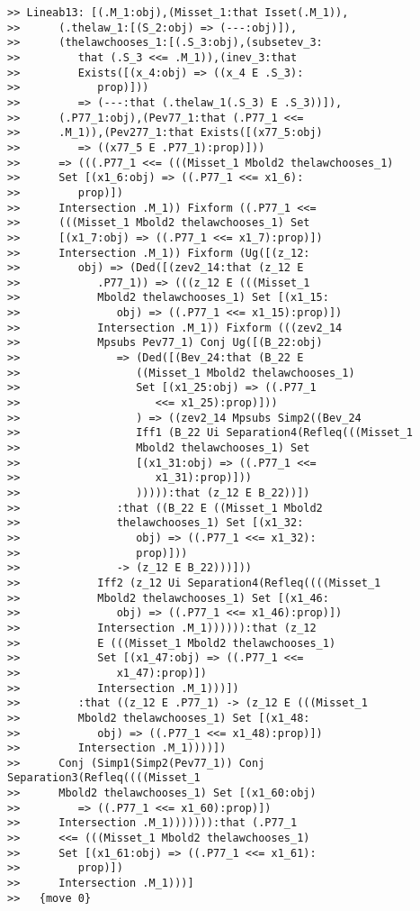\documentclass[12pt]{article}
\begin{document}
\begin{verbatim}
>> Lineab13: [(.M_1:obj),(Misset_1:that Isset(.M_1)),
>>      (.thelaw_1:[(S_2:obj) => (---:obj)]),
>>      (thelawchooses_1:[(.S_3:obj),(subsetev_3:
>>         that (.S_3 <<= .M_1)),(inev_3:that
>>         Exists([(x_4:obj) => ((x_4 E .S_3):
>>            prop)]))
>>         => (---:that (.thelaw_1(.S_3) E .S_3))]),
>>      (.P77_1:obj),(Pev77_1:that (.P77_1 <<=
>>      .M_1)),(Pev277_1:that Exists([(x77_5:obj)
>>         => ((x77_5 E .P77_1):prop)]))
>>      => (((.P77_1 <<= (((Misset_1 Mbold2 thelawchooses_1)
>>      Set [(x1_6:obj) => ((.P77_1 <<= x1_6):
>>         prop)])
>>      Intersection .M_1)) Fixform ((.P77_1 <<=
>>      (((Misset_1 Mbold2 thelawchooses_1) Set
>>      [(x1_7:obj) => ((.P77_1 <<= x1_7):prop)])
>>      Intersection .M_1)) Fixform (Ug([(z_12:
>>         obj) => (Ded([(zev2_14:that (z_12 E
>>            .P77_1)) => (((z_12 E (((Misset_1
>>            Mbold2 thelawchooses_1) Set [(x1_15:
>>               obj) => ((.P77_1 <<= x1_15):prop)])
>>            Intersection .M_1)) Fixform (((zev2_14
>>            Mpsubs Pev77_1) Conj Ug([(B_22:obj)
>>               => (Ded([(Bev_24:that (B_22 E
>>                  ((Misset_1 Mbold2 thelawchooses_1)
>>                  Set [(x1_25:obj) => ((.P77_1
>>                     <<= x1_25):prop)]))
>>                  ) => ((zev2_14 Mpsubs Simp2((Bev_24
>>                  Iff1 (B_22 Ui Separation4(Refleq(((Misset_1
>>                  Mbold2 thelawchooses_1) Set
>>                  [(x1_31:obj) => ((.P77_1 <<=
>>                     x1_31):prop)]))
>>                  ))))):that (z_12 E B_22))])
>>               :that ((B_22 E ((Misset_1 Mbold2
>>               thelawchooses_1) Set [(x1_32:
>>                  obj) => ((.P77_1 <<= x1_32):
>>                  prop)]))
>>               -> (z_12 E B_22)))]))
>>            Iff2 (z_12 Ui Separation4(Refleq((((Misset_1
>>            Mbold2 thelawchooses_1) Set [(x1_46:
>>               obj) => ((.P77_1 <<= x1_46):prop)])
>>            Intersection .M_1)))))):that (z_12
>>            E (((Misset_1 Mbold2 thelawchooses_1)
>>            Set [(x1_47:obj) => ((.P77_1 <<=
>>               x1_47):prop)])
>>            Intersection .M_1)))])
>>         :that ((z_12 E .P77_1) -> (z_12 E (((Misset_1
>>         Mbold2 thelawchooses_1) Set [(x1_48:
>>            obj) => ((.P77_1 <<= x1_48):prop)])
>>         Intersection .M_1))))])
>>      Conj (Simp1(Simp2(Pev77_1)) Conj Separation3(Refleq((((Misset_1
>>      Mbold2 thelawchooses_1) Set [(x1_60:obj)
>>         => ((.P77_1 <<= x1_60):prop)])
>>      Intersection .M_1))))))):that (.P77_1
>>      <<= (((Misset_1 Mbold2 thelawchooses_1)
>>      Set [(x1_61:obj) => ((.P77_1 <<= x1_61):
>>         prop)])
>>      Intersection .M_1)))]
>>   {move 0}



\end{verbatim}
\end{document}
